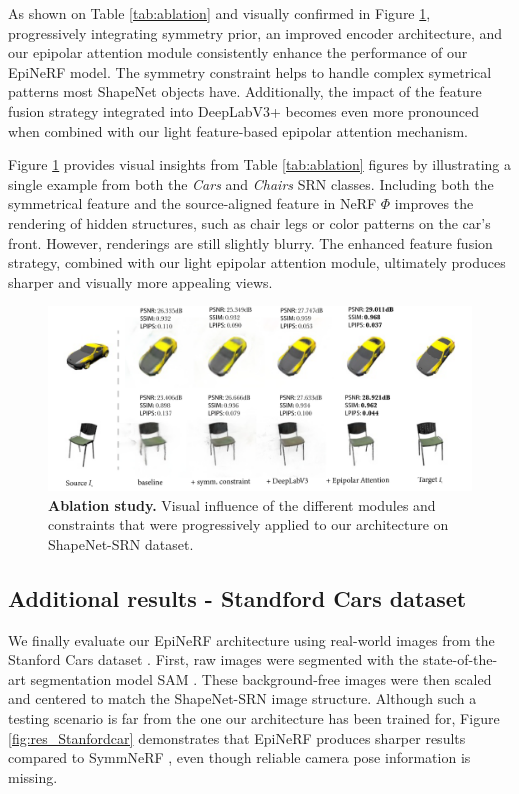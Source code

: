 As shown on Table \ref{tab:ablation} and visually confirmed in Figure \ref{fig:ablation}, progressively integrating symmetry prior, an improved encoder architecture, and our epipolar attention module consistently enhance the performance of our EpiNeRF model. The symmetry constraint helps to handle complex symetrical patterns most ShapeNet objects have. Additionally, the impact of the feature fusion strategy integrated into DeepLabV3+ becomes even more pronounced when combined with our light feature-based epipolar attention mechanism. 

Figure \ref{fig:ablation} provides visual insights from Table \ref{tab:ablation} figures by illustrating a single example from both the \textit{Cars} and \textit{Chairs} SRN classes. Including both the symmetrical feature and the source-aligned feature in NeRF $\Phi$ improves the rendering of hidden structures, such as chair legs or color patterns on the car’s front. However, renderings are still slightly blurry. The enhanced feature fusion strategy, combined with our light epipolar attention module, ultimately produces sharper and visually more appealing views. \newline 


\begin{figure}[h!]
    \begin{center}
  \includegraphics[width=\linewidth]{images/epinerf/supp_ablation_illustration.png}
  \caption{\textbf{Ablation study.} Visual influence of the different modules and constraints that were progressively applied to our architecture on ShapeNet-SRN dataset.}
  \label{fig:ablation}
  \end{center}
\end{figure}  


\subsection{Additional results - Standford Cars dataset }
We finally evaluate our EpiNeRF architecture using real-world images from the Stanford Cars dataset  \citep{krause20133d}. First, raw images were segmented with the state-of-the-art segmentation model SAM \citep{kirillov2023segment}. These background-free images were then scaled and centered to match the ShapeNet-SRN image structure. Although such a testing scenario is far from the one our architecture has been trained for, Figure \ref{fig:res_Stanfordcar} demonstrates that EpiNeRF produces sharper results compared to SymmNeRF \citep{li2022symmnerf}, even though reliable camera pose information is missing.


